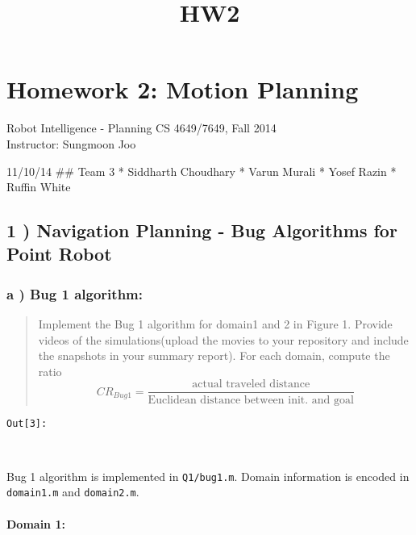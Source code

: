 \documentclass{article}
\title{HW2}
\begin{document}
    
    
    \maketitle
    
    

    

    \section{Homework 2: Motion Planning}


    Robot Intelligence - Planning CS 4649/7649, Fall 2014\\Instructor:
Sungmoon Joo

11/10/14 \#\# Team 3 * Siddharth Choudhary * Varun Murali * Yosef Razin
* Ruffin White


    \subsection{1 ) Navigation Planning - Bug Algorithms for Point Robot}



    \subsubsection{a ) Bug 1 algorithm:}


    \begin{quote}
Implement the Bug 1 algorithm for domain1 and 2 in Figure 1. Provide
videos of the simulations(upload the movies to your repository and
include the snapshots in your summary report). For each domain, compute
the ratio
\[{CR}_{Bug1} = \frac{\mbox{actual traveled distance}}{\mbox{Euclidean distance between init. and goal}}\]
\end{quote}

\texttt{\color{outcolor}Out[{\color{outcolor}3}]:}
    
    \begin{center}
    \end{center}
    { \hspace*{\fill} \\}
    

    Bug 1 algorithm is implemented in \texttt{Q1/bug1.m}. Domain information
is encoded in \texttt{domain1.m} and \texttt{domain2.m}.


    \paragraph{Domain 1:}
\end{document}
